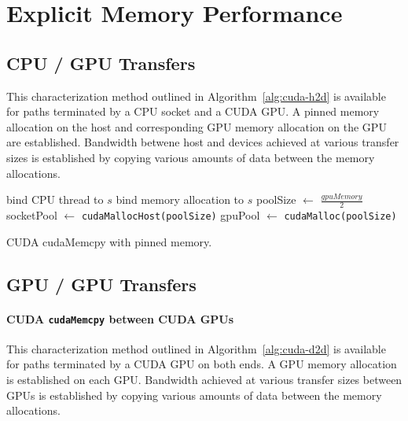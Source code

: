 \chapter{Explicit Memory Performance}
\label{ch:explicit-char}

\section{CPU / GPU Transfers}

This characterization method outlined in Algorithm~\ref{alg:cuda-h2d} is available for paths terminated by a CPU socket and a CUDA GPU.
A pinned memory allocation on the host and corresponding GPU memory allocation on the GPU are established.
Bandwidth betwene host and devices achieved at various transfer sizes is established by copying various amounts of data between the memory allocations.


\begin{algorithm}[ht]
    \SetAlgoLined
    bind CPU thread to $s$\;
    bind memory allocation to $s$\;
    poolSize $\gets$ $\frac{gpuMemory}{2}$\;
    socketPool $\gets$ \texttt{cudaMallocHost(poolSize)}\;
    gpuPool $\gets$ \texttt{cudaMalloc(poolSize)}\;
    \caption{CUDA cudaMemcpy with pinned memory.}
    \label{alg:cuda-h2d}
\end{algorithm}

\section{GPU / GPU Transfers}


\subsubsection{CUDA \texttt{cudaMemcpy} between CUDA GPUs}

This characterization method outlined in Algorithm~\ref{alg:cuda-d2d} is available for paths terminated by a CUDA GPU on both ends.
A GPU memory allocation is established on each GPU.
Bandwidth achieved at various transfer sizes between GPUs is established by copying various amounts of data between the memory allocations.


